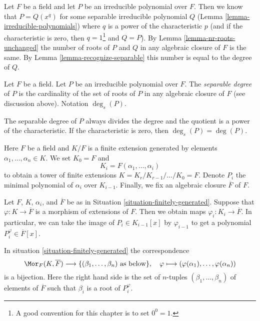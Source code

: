 \noindent
Let $F$ be a field and let $P$ be an irreducible polynomial over $F$.
Then we know that $P = Q(x^q)$ for some separable irreducible polynomial $Q$
(Lemma \ref{lemma-irreducible-polynomials}) where $q$ is a power of
the characteristic $p$ (and if the characteristic is zero, then
$q = 1$\footnote{A good convention for this chapter is to set $0^0 = 1$.}
and $Q = P$). By Lemma \ref{lemma-nr-roots-unchanged} the number of
roots of $P$ and $Q$ in any algebraic closure of $F$ is the same.
By Lemma \ref{lemma-recognize-separable} this number is equal to the degree
of $Q$.

\begin{definition}
\label{definition-separable-degree}
Let $F$ be a field. Let $P$ be an irreducible polynomial over $F$.
The {\it separable degree} of $P$ is the cardinality of the
set of roots of $P$ in any algebraic closure of $F$ (see discussion
above). Notation $\deg_s(P)$.
\end{definition}

\noindent
The separable degree of $P$ always divides the degree and the quotient
is a power of the characteristic. If the characteristic is zero, then
$\deg_s(P) = \deg(P)$.

\begin{situation}
\label{situation-finitely-generated}
Here $F$ be a field and $K/F$ is a finite extension generated by elements
$\alpha_1, \ldots, \alpha_n \in K$. We set $K_0 = F$ and
$$
K_i = F(\alpha_1, \dots, \alpha_i)
$$
to obtain a tower of finite extensions
$K = K_r / K_{r - 1} / \ldots / K_0 = F$.
Denote $P_i$ the minimal polynomial of $\alpha_i$ over $K_{i - 1}$.
Finally, we fix an algebraic closure $\overline{F}$ of $F$.
\end{situation}

\noindent
Let $F$, $K$, $\alpha_i$, and $\overline{F}$ be as in
Situation \ref{situation-finitely-generated}.
Suppose that $\varphi : K \to \overline{F}$ is a morphism of extensions
of $F$. Then we obtain maps $\varphi_i : K_i \to \overline{F}$.
In particular, we can take the image of $P_i \in K_{i - 1}[x]$ by
$\varphi_{i - 1}$ to get a polynomial $P_i^\varphi \in \overline{F}[x]$.

\begin{lemma}
\label{lemma-count-embeddings}
In situation \ref{situation-finitely-generated} the correspondence
$$
\Mor_F(K, \overline{F})
\longrightarrow
\{(\beta_1, \ldots, \beta_n)\text{ as below}\},
\quad
\varphi \longmapsto (\varphi(\alpha_1), \ldots, \varphi(\alpha_n))
$$
is a bijection. Here the right hand side is the set of $n$-tuples
$(\beta_1, \ldots, \beta_n)$ of elements of $\overline{F}$
such that $\beta_i$ is a root of $P_i^\varphi$.
\end{lemma}

